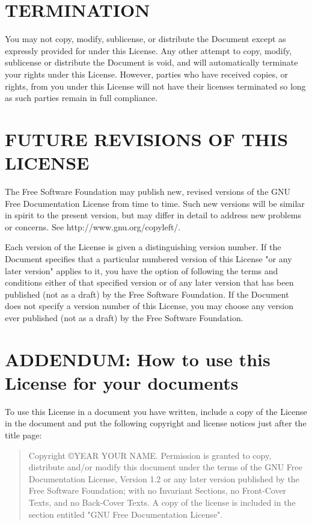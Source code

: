 \documentclass{stacks-project-book}
\theoremstyle{plain}
\theoremstyle{definition}
\theoremstyle{remark}
\numberwithin{equation}{subsection}
\begin{document}
\section{TERMINATION}
\label{fdl-section-termination}


You may not copy, modify, sublicense, or distribute the Document except
as expressly provided for under this License.  Any other attempt to
copy, modify, sublicense or distribute the Document is void, and will
automatically terminate your rights under this License.  However,
parties who have received copies, or rights, from you under this
License will not have their licenses terminated so long as such
parties remain in full compliance.


\section{FUTURE REVISIONS OF THIS LICENSE}
\label{fdl-section-future-revisions-of-this-license}


The Free Software Foundation may publish new, revised versions
of the GNU Free Documentation License from time to time.  Such new
versions will be similar in spirit to the present version, but may
differ in detail to address new problems or concerns.  See
http://www.gnu.org/copyleft/.

Each version of the License is given a distinguishing version number.
If the Document specifies that a particular numbered version of this
License "or any later version" applies to it, you have the option of
following the terms and conditions either of that specified version or
of any later version that has been published (not as a draft) by the
Free Software Foundation.  If the Document does not specify a version
number of this License, you may choose any version ever published (not
as a draft) by the Free Software Foundation.


\section{ADDENDUM: How to use this License for your documents}
\label{fdl-section-addendum-how-to-use-this-license-for-your-documents}

To use this License in a document you have written, include a copy of
the License in the document and put the following copyright and
license notices just after the title page:

\bigskip
\begin{quote}
    Copyright \copyright  YEAR  YOUR NAME.
    Permission is granted to copy, distribute and/or modify this document
    under the terms of the GNU Free Documentation License, Version 1.2
    or any later version published by the Free Software Foundation;
    with no Invariant Sections, no Front-Cover Texts, and no Back-Cover Texts.
    A copy of the license is included in the section entitled "GNU
    Free Documentation License".
\end{quote}
\bigskip
\end{document}
